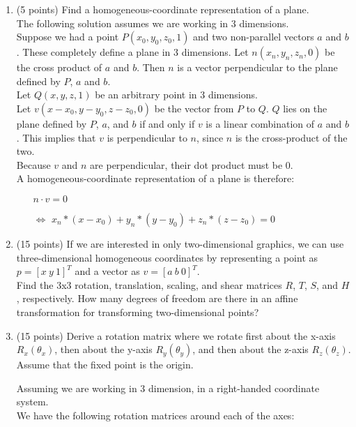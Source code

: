 \documentclass[13pt]{letter}
\begin{document}
\begin{enumerate}
	\item (5 points)
	Find a homogeneous-coordinate representation of a plane. \\
	
	The following solution assumes we are working in 3 dimensions. \\
	Suppose we had a point $P(x_0, y_0, z_0, 1)$ and two non-parallel vectors $a$ and $b$. These completely define a plane in 3 dimensions. Let $n(x_n, y_n, z_n, 0)$ be the cross product of $a$ and $b$. Then $n$ is a vector perpendicular to the plane defined by $P$, $a$ and $b$. \\
	Let $Q(x, y, z, 1)$ be an arbitrary point in 3 dimensions. \\
	Let $v(x-x_0, y-y_0, z-z_0, 0)$ be the vector from $P$ to $Q$. $Q$ lies on the plane defined by $P$, $a$, and $b$ if and only if $v$ is a linear combination of $a$ and $b$. This implies that $v$ is perpendicular to $n$, since $n$ is the cross-product of the two. \\
	Because $v$ and $n$ are perpendicular, their dot product must be 0. \\
	A homogeneous-coordinate representation of a plane is therefore:
	\begin{enumerate}
		\item[] $n \cdot v = 0$
    \item[$\Leftrightarrow$] $x_n * (x-x_0) + y_n * (y-y_0) + z_n * (z-z_0) = 0$
	\end{enumerate}
	
	\item (15 points)
	If we are interested in only two-dimensional graphics, we can use three-dimensional homogeneous coordinates by representing a point as $p = [x~y~1]^T$ and a vector as $v = [a~b~0]^T$. \\
	Find the 3x3 rotation, translation, scaling, and shear matrices $R$, $T$, $S$, and $H$, respectively. How many degrees of freedom are there in an affine transformation for transforming two-dimensional points?
	
	\item (15 points)
	Derive a rotation matrix where we rotate first about the x-axis $R_x(\theta_x)$, then about the y-axis $R_y(\theta_y)$, and then about the z-axis $R_z(\theta_z)$. Assume that the fixed point is the origin.
	
	Assuming we are working in 3 dimension, in a right-handed coordinate system. \\
	We have the following rotation matrices around each of the axes:


\end{enumerate}
\end{document}

